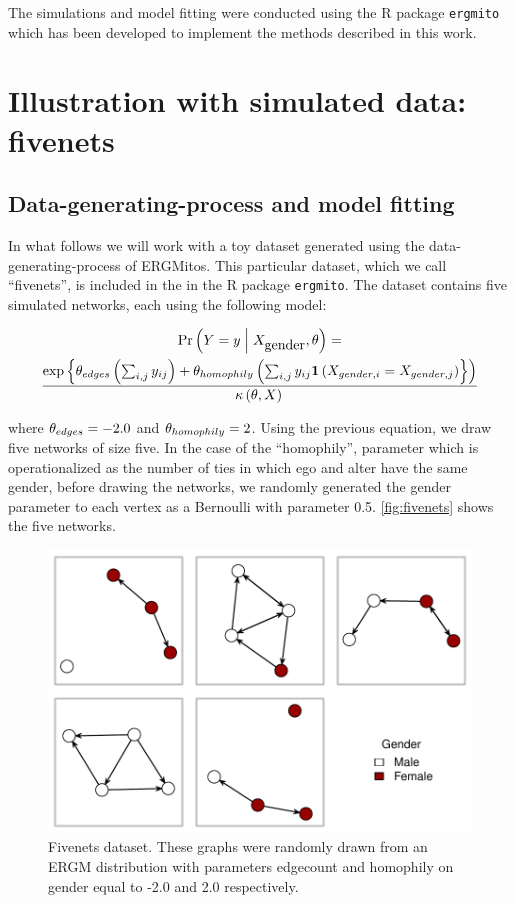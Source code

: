 \documentclass[12pt]{article}
\begin{document}
The simulations and model fitting were conducted using the R package \texttt{ergmito} which has been developed to implement the methods described in this work.

\section{Illustration with simulated data: fivenets}

\subsection{Data-generating-process and model fitting}

In what follows we will work with a toy dataset generated using the data-generating-process of ERGMitos. This particular dataset, which we call ``fivenets'', is included in the in the R package \texttt{ergmito}. The dataset contains five simulated networks, each using the following model:

\begin{multline*}
\Prcond{\Adjmat = \adjmat}{\Indepvar_{\mbox{gender}}, \params} = \\
\frac{ %
    \exp{\params_{edges}\left(\sum_{i,j} \adjmat_{ij}\right) + %
    \params_{homophily}\left(\sum_{i,j} \adjmat_{ij}\isone{\Indepvar_{gender, i} = \Indepvar_{gender, j}}}\right) %
    }{%
    \normconst{}
    }
\end{multline*}

\noindent where $\theta_{edges} = -2.0$ and $\theta_{homophily} = 2$. Using the previous equation, we draw five networks of size five. In the case of the ``homophily'', parameter which is operationalized as the number of ties in which ego and alter have the same gender, before drawing the networks, we randomly generated the gender parameter to each vertex as a Bernoulli with parameter 0.5. \autoref{fig:fivenets} shows the five networks.

\begin{figure}[tb]
    \centering
    \includegraphics[width=.6\linewidth]{figures/fivenets_graphs.pdf}
    \caption{\label{fig:fivenets}Fivenets dataset. These graphs were randomly drawn from an ERGM distribution with parameters edgecount and homophily on gender equal to -2.0 and 2.0 respectively.}
    \label{fig:my_label}
\end{figure}
\end{document}
